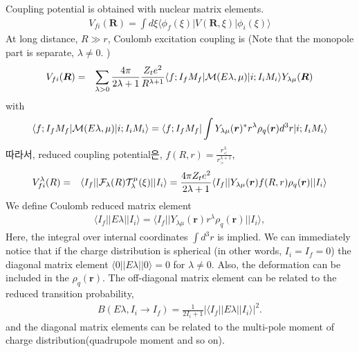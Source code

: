 \documentclass[11pt]{book}
\def\bm{\boldsymbol}
\def\vr{{\bm r}}
\def\vR{{\bm R}}
\def\la{\langle}
\def\ra{\rangle}
\newcommand{\bea}{\begin{eqnarray}}
\newcommand{\eea}{\end{eqnarray}}
\newcommand{\no}{\nonumber \\}
\begin{document}
Coupling potential is obtained with nuclear matrix elements.
\bea 
V_{fi}(\vR)=\int d\xi \la \phi_f(\xi)| V(\vR,\xi)|\phi_i(\xi)\ra 
\eea 
At long distance, ${R\gg r}$, Coulomb excitation coupling is (Note that the monopole part is separate, $\lambda\neq 0$. )
\bea 
V_{fi}(\vR)&=& \sum_{\lambda >0}\frac{4\pi }{2\lambda+1}\frac{Z_t e^2}{R^{\lambda+1}}\la f;I_f M_f|{\cal M}(E\lambda,\mu)|i;I_i M_i\ra  Y_{\lambda\mu}(\vR)
\eea 
with 
\bea 
\la f;I_f M_f|{\cal M}(E\lambda,\mu)|i;I_i M_i\ra=\la f;I_f M_f|\int Y_{\lambda\mu}(\vr)^* r^\lambda\rho_q(\vr)d^3 r|i;I_i M_i\ra  
\eea 
따라서, reduced coupling potential은, $f(R,r)=\frac{r_{<}^\lambda}{r_{>}^{\lambda+1}}$,
\bea 
V_{fi}^\lambda(R)&=&\la I_f||{\cal F}_\lambda(R) {\cal T}_{\lambda}^\mu(\xi)||I_i\ra 
= \frac{4\pi Z_t e^2}{2\lambda+1} 
\la I_f|| Y_{\lambda\mu}(\vr) f(R,r) \rho_q(\vr)|| I_i\ra \no 
\eea 
We define Coulomb reduced matrix element
\bea 
\la I_f||E\lambda||I_i\ra = \la I_f|| Y_{\lambda\mu}(\vr) r^\lambda \rho_q(\vr)|| I_i\ra,
\eea 
Here, the integral over internal coordinates $\int d^3 r$ is implied. 
We can immediately notice that if the charge distribution is spherical
(in other words, $I_i=I_f=0$) the diagonal matrix element 
$\la 0|| E\lambda||0\ra=0$ for $\lambda\neq 0$. Also, the deformation 
can be included in the $\rho_q(\vr)$. The off-diagonal matrix element can be
related to the reduced transition probability,
\bea 
B(E\lambda, I_i\to I_f)=\frac{1}{2I_i+1}|\la I_f||E\lambda||I_i\ra|^2.
\eea 
and the diagonal matrix elements can be 
related to the multi-pole moment of charge distribution(quadrupole moment and so on). 
\end{document}
